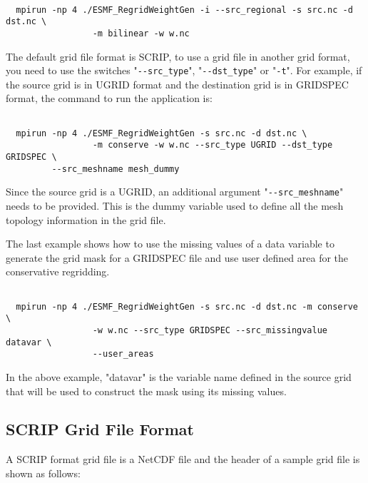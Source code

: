 \begin{verbatim}

  mpirun -np 4 ./ESMF_RegridWeightGen -i --src_regional -s src.nc -d dst.nc \
                 -m bilinear -w w.nc

\end{verbatim}

The default grid file format is SCRIP, to use a grid file in another grid format, you 
need to use the switches "{\tt \verb+--+src\_type}", "{\tt \verb+--+dst\_type}" or "{\tt -t}".  For example, if the 
source grid is in UGRID format and the destination grid is in GRIDSPEC format, the command 
to run the application is:

\begin{verbatim}

  mpirun -np 4 ./ESMF_RegridWeightGen -s src.nc -d dst.nc \
                 -m conserve -w w.nc --src_type UGRID --dst_type GRIDSPEC \
		 --src_meshname mesh_dummy

\end{verbatim}
 
Since the source grid is a UGRID, an additional argument "{\tt \verb+--+src\_meshname}" needs to be provided.  This is the dummy variable used to define all the mesh topology information in the 
grid file.

The last example shows how to use the missing values of a data variable to generate the 
grid mask for a GRIDSPEC file and use user defined area for the conservative regridding.

\begin{verbatim}

  mpirun -np 4 ./ESMF_RegridWeightGen -s src.nc -d dst.nc -m conserve \
                 -w w.nc --src_type GRIDSPEC --src_missingvalue datavar \
                 --user_areas

\end{verbatim}
  
In the above example, "datavar" is the variable name defined in the source grid that will
 be used to construct the mask using its missing values.  

\subsection{SCRIP Grid File Format}\label{sec:fileformat:scrip}

A SCRIP format grid file is a NetCDF file and the header of a sample grid file is shown as follows:

